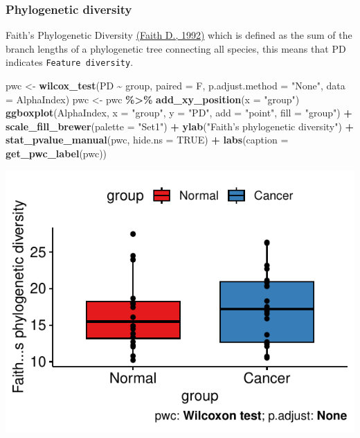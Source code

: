 \documentclass[
]{article}
\newenvironment{Shaded}{\begin{snugshade}}{\end{snugshade}}
\newcommand{\AttributeTok}[1]{\textcolor[rgb]{0.13,0.29,0.53}{#1}}
\newcommand{\ConstantTok}[1]{\textcolor[rgb]{0.56,0.35,0.01}{#1}}
\newcommand{\FunctionTok}[1]{\textcolor[rgb]{0.13,0.29,0.53}{\textbf{#1}}}
\newcommand{\NormalTok}[1]{#1}
\newcommand{\OtherTok}[1]{\textcolor[rgb]{0.56,0.35,0.01}{#1}}
\newcommand{\SpecialCharTok}[1]{\textcolor[rgb]{0.81,0.36,0.00}{\textbf{#1}}}
\newcommand{\StringTok}[1]{\textcolor[rgb]{0.31,0.60,0.02}{#1}}
\begin{document}
\hypertarget{phylogenetic-diversity}{%
\subsubsection{Phylogenetic diversity}\label{phylogenetic-diversity}}

Faith's Phylogenetic Diversity
\href{https://www.sciencedirect.com/science/article/abs/pii/0006320792912013}{(Faith
D., 1992)} which is defined as the sum of the branch lengths of a
phylogenetic tree connecting all species, this means that PD indicates
\texttt{Feature\ diversity}.

\begin{Shaded}
\begin{Highlighting}[]
\NormalTok{pwc }\OtherTok{\textless{}{-}} \FunctionTok{wilcox\_test}\NormalTok{(PD }\SpecialCharTok{\textasciitilde{}}\NormalTok{ group, }\AttributeTok{paired =}\NormalTok{ F, }\AttributeTok{p.adjust.method =} \StringTok{"None"}\NormalTok{, }\AttributeTok{data =}\NormalTok{ AlphaIndex)}
\NormalTok{pwc }\OtherTok{\textless{}{-}}\NormalTok{ pwc }\SpecialCharTok{\%\textgreater{}\%} \FunctionTok{add\_xy\_position}\NormalTok{(}\AttributeTok{x =} \StringTok{"group"}\NormalTok{)}
\FunctionTok{ggboxplot}\NormalTok{(AlphaIndex, }\AttributeTok{x =} \StringTok{"group"}\NormalTok{, }\AttributeTok{y =} \StringTok{"PD"}\NormalTok{, }\AttributeTok{add =} \StringTok{"point"}\NormalTok{, }\AttributeTok{fill =} \StringTok{"group"}\NormalTok{) }\SpecialCharTok{+}
  \FunctionTok{scale\_fill\_brewer}\NormalTok{(}\AttributeTok{palette =} \StringTok{"Set1"}\NormalTok{) }\SpecialCharTok{+} \FunctionTok{ylab}\NormalTok{(}\StringTok{"Faith’s phylogenetic diversity"}\NormalTok{) }\SpecialCharTok{+}
  \FunctionTok{stat\_pvalue\_manual}\NormalTok{(pwc, }\AttributeTok{hide.ns =} \ConstantTok{TRUE}\NormalTok{) }\SpecialCharTok{+}
  \FunctionTok{labs}\NormalTok{(}\AttributeTok{caption =} \FunctionTok{get\_pwc\_label}\NormalTok{(pwc))}
\end{Highlighting}
\end{Shaded}

\includegraphics[width=0.7\linewidth,height=0.7\textheight]{workshop_files/figure-latex/unnamed-chunk-19-1}
\end{document}
